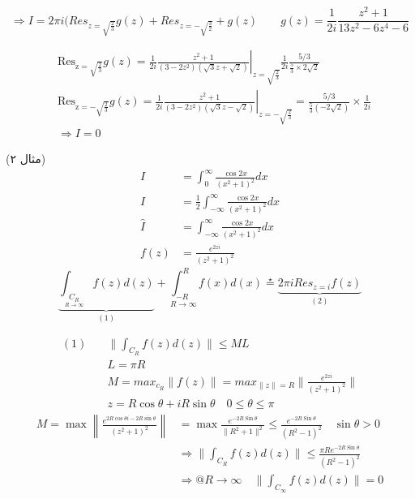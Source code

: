 \[
\Rightarrow I=2\pi i(Res_{z=\sqrt{\frac{2}{3}}} g(z) +Res_{z=-\sqrt{\frac{3}{2}}}+g(z) \quad\quad g(z) = \frac{1}{2 i} \frac{z^{2}+1}{13 z^{2}-6 z^{4}-6}
\]

\begin{align*}
&\operatorname{Res_{z=\sqrt{\frac{2}{3}}}} g(z)=\left.\frac{1}{2 i} \frac{z^{2}+1}{\left(3-2 z^{2}\right)(\sqrt{3} z+\sqrt{2})}\right|_{z=\sqrt{\frac{2}{3}}}  \frac{1}{2 i} \frac{5 / 3}{\frac{5}{3} \times 2 \sqrt{2}} \\
&\operatorname{Res_{z=-\sqrt{\frac{2}{3}}}} g(z)=\left.\frac{1}{2 i} \frac{z^{2}+1}{\left(3-2 z^{2}\right)(\sqrt{3} z-\sqrt{2})}\right|_{z=-\sqrt{\frac{2}{3}}}=\frac{5 / 3}{\frac{5}{3}(-2 \sqrt{2})} \times \frac{1}{2 i} \\
&\Rightarrow I=0
\end{align*}

\example (مثال ۲)
\begin{align*}
	I&=\int_{0}^{\infty} \frac{\cos 2x}{(x^{2}+1)^{2}} dx \\
	I&=\frac{1}{2} \int_{-\infty}^{\infty} \frac{\cos 2x}{(x^{2}+1)^{2}} dx \\
	\hat I&= \int_{-\infty}^{\infty} \frac{\cos 2x}{(x^{2}+1)^{2}} dx \\
	f(z) &= \frac{e^{2zi}}{(z^{2}+1)^{2}}
\end{align*}
\begin{equation*}
	\underbrace{
	\int_{\underset{R\rightarrow \infty}{C_R}}
	f(z) d(z)}_{(1)}
	 + \underset{R\rightarrow \infty}{\int_{-R}^{R}} f(x) d(x) 
	 \overset{\star}{=}
	 \underbrace{
	  2\pi i Res_{z=i} f(z)}_{(2)}
\end{equation*}

\begin{align*}
	(1) \quad 
	&\|\int_{C_{R}} f(z) d(z) \| \leq ML \\
	&L=\pi R \\ 
	&M=max_{c_{R}}\|f(z)\| =max_{\|z\|=R}\| \frac {e^{2zi}}{(z^{2}+1)^{2}}\| \\
	&z=R \cos \theta+i R \sin \theta \quad 0 \leqslant \theta \leqslant \pi
\end{align*}
\begin{equation*}
\begin{split}
	M=\max \left\|\frac{e^{2 R \cos \theta i-2 R \sin \theta}}{\left(z^{2}+1\right)^{2}}\right\|&=\max \frac{e^{-2 R \operatorname{Sin} \theta}}{\| R^{2}+1\|^{2}}\leqslant \frac{e^{-2 R \operatorname{Sin} \theta}}{( R^{2}-1)^{2}} \quad \sin \theta>0 \\
	&\Rightarrow \| \int_{C_{R}} f(z) d(z) \| \leq \frac{\pi Re^{-2 R \operatorname{Sin} \theta}}{( R^{2}-1)^{2}} \\
	&\Rightarrow 
		@R \rightarrow\infty \quad \| \int_{C_{\infty}} f(z) d(z) \|=0
	\end{split}
\end{equation*}

